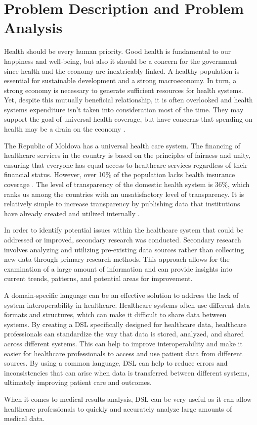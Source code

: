 \section{Problem Description and Problem Analysis}

Health should be every human priority. Good health is fundamental to our happiness and well-being, but also it should be a concern for the government since health and the economy are inextricably linked.
A healthy population is essential for sustainable development and a strong macroeconomy. In turn, a strong economy is necessary to generate sufficient resources for health systems. Yet, despite this mutually beneficial relationship, it is often overlooked and health systems expenditure isn’t taken into consideration most of the time. They may support the goal of universal health coverage, but have concerns that spending on health may be a drain on the economy \cite{health}.

The Republic of Moldova has a universal health care system. The financing of healthcare services in the country is based on the principles of fairness and unity, ensuring that everyone has equal access to healthcare services regardless of their financial status. However, over 10\% of the population lacks health insurance coverage \cite{country}. 
The level of transparency of the domestic health system is 36\%, which ranks us among the countries with an unsatisfactory level of transparency.  It is relatively simple to increase transparency by publishing data that institutions have already created and utilized internally \cite{carp}. \par
In order to identify potential issues within the healthcare system that could be addressed or improved, secondary research was conducted. Secondary research involves analyzing and utilizing pre-existing data sources rather than collecting new data through primary research methods. This approach allows for the examination of a large amount of information and can provide insights into current trends, patterns, and potential areas for improvement.

A domain-specific language can be an effective solution to address the lack of system interoperability in healthcare. Healthcare systems often use different data formats and structures, which can make it difficult to share data between systems. By creating a DSL specifically designed for healthcare data, healthcare professionals can standardize the way that data is stored, analyzed, and shared across different systems. This can help to improve interoperability and make it easier for healthcare professionals to access and use patient data from different sources. By using a common language, DSL can help to reduce errors and inconsistencies that can arise when data is transferred between different systems, ultimately improving patient care and outcomes. \par
When it comes to medical results analysis, DSL can be very useful as it can allow healthcare professionals to quickly and accurately analyze large amounts of medical data.


